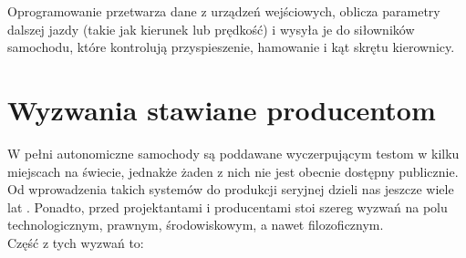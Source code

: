 Oprogramowanie przetwarza dane z urządzeń wejściowych, oblicza parametry dalszej jazdy (takie jak kierunek lub prędkość) i wysyła je do siłowników samochodu, które kontrolują przyspieszenie, hamowanie i kąt skrętu kierownicy.

\section{Wyzwania stawiane producentom}
W pełni autonomiczne samochody są poddawane wyczerpującym testom w kilku miejscach na świecie, jednakże żaden z nich nie jest obecnie dostępny publicznie. Od wprowadzenia takich systemów do produkcji seryjnej dzieli nas jeszcze wiele lat \cite{level5Cars:predictions}. Ponadto, przed projektantami i producentami stoi szereg wyzwań na polu technologicznym, prawnym, środowiskowym, a nawet filozoficznym. \\
Część z tych wyzwań to:
